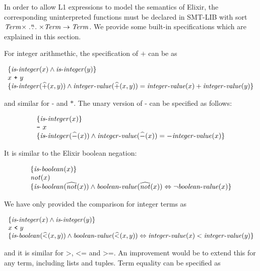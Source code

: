In order to allow L1 expressions to model the semantics of Elixir, the 
corresponding uninterpreted functions must be declared in SMT-LIB
with sort $\mathit{Term} \times \stackrel{n}{\dots} 
\times \mathit{Term} \rightarrow \mathit{Term}$. We provide 
some built-in specifications which are explained in this section.

For integer arithmethic, the specification of $\texttt{+}$ can be as

\[
\begin{array}{l}
\{ \mathit{is\mbox{-}integer}(x) \wedge \mathit{is\mbox{-}integer}(y) \}\\
x~\texttt{+}~y\\
\{ \mathit{is\mbox{-}integer}(\widehat{+}(x, y)) \wedge 
  \mathit{integer\mbox{-}value}(\widehat{+}(x, y)) = \mathit{integer\mbox{-}value}(x) + \mathit{integer\mbox{-}value}(y) \}
\end{array}
\]

and similar for $\texttt{-}$ and $\texttt{*}$. The unary 
version of $\texttt{-}$ can be specified as follows:

\[
\begin{array}{l}
\{ \mathit{is\mbox{-}integer}(x) \}\\
\texttt{-}~x\\
\{ \mathit{is\mbox{-}integer}(\widehat{-}(x)) \wedge 
  \mathit{integer\mbox{-}value}(\widehat{-}(x)) = -\mathit{integer\mbox{-}value}(x) \}
\end{array}
\]

It is similar to the Elixir boolean negation:

\[
\begin{array}{l}
\{ \mathit{is\mbox{-}boolean}(x) \}\\
\mathit{not}(x)\\
\{ \mathit{is\mbox{-}boolean}(\widehat{\mathit{not}}(x)) \wedge 
  \mathit{boolean\mbox{-}value}(\widehat{\mathit{not}}(x)) \Leftrightarrow \neg\mathit{boolean\mbox{-}value}(x) \}
\end{array}
\]

We have only provided the comparison for integer terms as

\[
\begin{array}{l}
\{ \mathit{is\mbox{-}integer}(x) \wedge \mathit{is\mbox{-}integer}(y) \}\\
x~\texttt{<}~y\\
\{ \mathit{is\mbox{-}boolean}(\widehat{<}(x, y)) \wedge 
  \mathit{boolean\mbox{-}value}(\widehat{<}(x, y)) \Leftrightarrow \mathit{integer\mbox{-}value}(x) < \mathit{integer\mbox{-}value}(y) \}
\end{array}
\]

and it is similar for $\texttt{>}$, $\texttt{<=}$ and $\texttt{>=}$. An improvement would
be to extend this for any term, including lists and tuples. Term equality 
can be specified as

